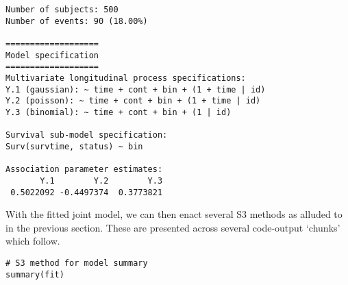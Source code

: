 \vspace*{-5mm}
\begin{small}
\begin{verbatim}
Number of subjects: 500
Number of events: 90 (18.00%)

===================
Model specification
===================
Multivariate longitudinal process specifications: 
Y.1 (gaussian): ~ time + cont + bin + (1 + time | id)
Y.2 (poisson): ~ time + cont + bin + (1 + time | id)
Y.3 (binomial): ~ time + cont + bin + (1 | id)

Survival sub-model specification: 
Surv(survtime, status) ~ bin

Association parameter estimates: 
       Y.1        Y.2        Y.3 
 0.5022092 -0.4497374  0.3773821     
\end{verbatim}
\end{small}
With the fitted joint model, we can then enact several S3 methods as alluded to in the previous section. These are presented across several code-output `chunks' which follow.
\begin{lstlisting}
# S3 method for model summary
summary(fit)
\end{lstlisting}
\vspace*{-5mm}
